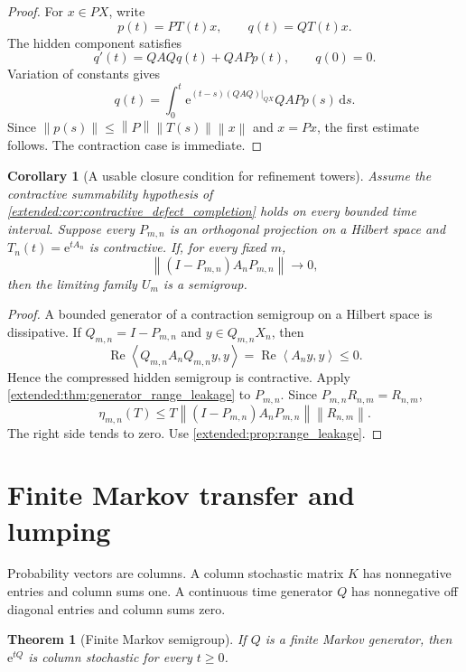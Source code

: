 \documentclass[11pt,letterpaper]{article}
\newtheorem{theorem}{Theorem}[section]
\theoremstyle{plain}
\theoremstyle{plain}
\theoremstyle{plain}
\newtheorem{corollary}[corollary]{Corollary}
\theoremstyle{definition}
\theoremstyle{definition}
\theoremstyle{definition}
\theoremstyle{definition}
\theoremstyle{definition}
\theoremstyle{remark}
\theoremstyle{remark}
\theoremstyle{remark}
\theoremstyle{remark}
\theoremstyle{remark}
\newcommand{\norm}[1]{\left\lVert#1\right\rVert}
\theoremstyle{remark}
\newcommand{\e}{\mathrm e}
\newcommand{\dd}{\,\mathrm d}
\newcommand{\ip}[2]{\left\langle#1,#2\right\rangle}
\let\KomorebiPrimitivemathrm\mathrm
\renewcommand{\mathrm}[1]{{\KomorebiPrimitivemathrm{#1}}}
\begin{document}
\begin{proof}
For \(x\in PX\), write
\[
p(t)=PT(t)x,
\qquad
q(t)=QT(t)x.
\]
The hidden component satisfies
\[
q'(t)=QAQq(t)+QAPp(t),
\qquad
q(0)=0.
\]
Variation of constants gives
\[
q(t)=
\int_0^t
\e^{(t-s)(QAQ)|_{QX}}
QAPp(s)
\dd s.
\]
Since
\(
\norm{p(s)}\leq\norm P\norm{T(s)}\norm x
\)
and \(x=Px\), the first estimate follows. The contraction case is immediate.
\end{proof}

\begin{corollary}[A usable closure condition for refinement towers]\label{extended:record:027}\label{extended:cor:generator_closure_tower}
Assume the contractive summability hypothesis of \cref{extended:cor:contractive_defect_completion} holds on every bounded time interval. Suppose every \(P_{m,n}\) is an orthogonal projection on a Hilbert space and \(T_n(t)=\e^{tA_n}\) is contractive. If, for every fixed \(m\),
\[
\norm{(I-P_{m,n})A_nP_{m,n}}
\longrightarrow0,
\]
then the limiting family \(U_m\) is a semigroup.
\end{corollary}

\begin{proof}
A bounded generator of a contraction semigroup on a Hilbert space is dissipative. If \(Q_{m,n}=I-P_{m,n}\) and \(y\in Q_{m,n}X_n\), then
\[
\operatorname{Re}\ip{Q_{m,n}A_nQ_{m,n}y}{y}
=
\operatorname{Re}\ip{A_ny}{y}
\leq0.
\]
Hence the compressed hidden semigroup is contractive. Apply \cref{extended:thm:generator_range_leakage} to \(P_{m,n}\). Since \(P_{m,n}R_{n,m}=R_{n,m}\),
\[
\eta_{m,n}(T)
\leq
T\norm{(I-P_{m,n})A_nP_{m,n}}
\norm{R_{n,m}}.
\]
The right side tends to zero. Use \cref{extended:prop:range_leakage}.
\end{proof}

\FloatBarrier
\section{Finite Markov transfer and lumping}\label{extended:section:05}\label{extended:sec:markov}

Probability vectors are columns. A column stochastic matrix \(K\) has nonnegative entries and column sums one. A continuous time generator \(Q\) has nonnegative off diagonal entries and column sums zero.

\begin{theorem}[Finite Markov semigroup]\label{extended:record:028}\label{extended:thm:finite_markov}
If \(Q\) is a finite Markov generator, then \(\e^{tQ}\) is column stochastic for every \(t\geq0\).
\end{theorem}
\end{document}
